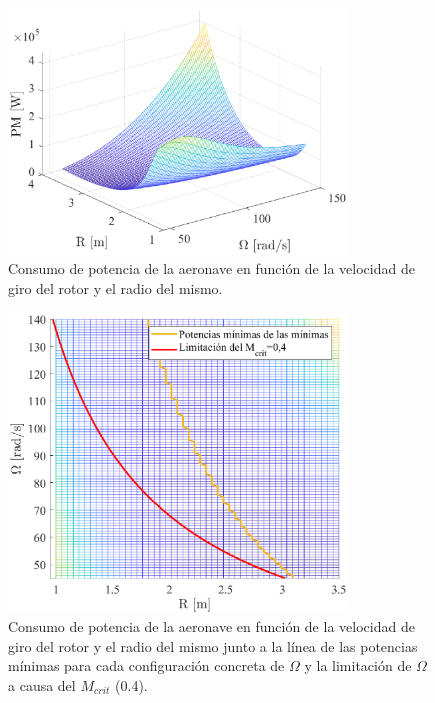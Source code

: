 \begin{figure}
	\centering
	\includegraphics[width=90mm]{graficos/3d3d}
	\caption{Consumo de potencia de la aeronave en función de la velocidad de giro del rotor y el radio del mismo.}
	\label{ORP}
\end{figure}
\begin{figure}
	\centering
	\includegraphics[width=90mm]{graficos/3d2d}
	\caption{Consumo de potencia de la aeronave en función de la velocidad de giro del rotor y el radio del mismo junto a la línea de las potencias mínimas para cada configuración concreta de $\Omega$ y la limitación de $\Omega$ a causa del $M_{crit}$ (0.4).}
	\label{ORPM}
\end{figure}

